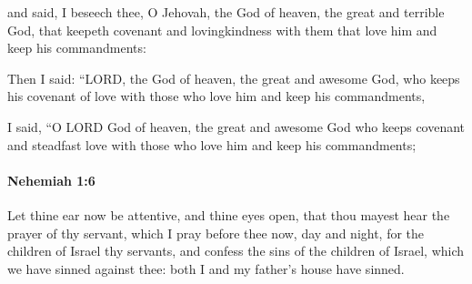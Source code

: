 			\begin{versebox}
					\item[BHS] 
					\item[LXX] 
					\item[ASV] and said, I beseech thee, O Jehovah, the God of heaven, the great and terrible God, that keepeth covenant and lovingkindness with them that love him and keep his commandments:
					\item[NIV] Then I said: “LORD, the God of heaven, the great and awesome God, who keeps his covenant of love with those who love him and keep his commandments,
					\item[NRSV] I said, “O LORD God of heaven, the great and awesome God who keeps covenant and steadfast love with those who love him and keep his commandments;
			\end{versebox}

		\paragraph{Nehemiah 1:6} %
			\label{NEHEMIAH-1-6}

			Let thine ear now be attentive, and thine eyes open, that thou mayest hear the prayer of thy servant, which I pray before thee now, day and night, for the children of Israel thy servants, and confess the sins of the children of Israel, which we have sinned against thee: both I and my father’s house have sinned.


